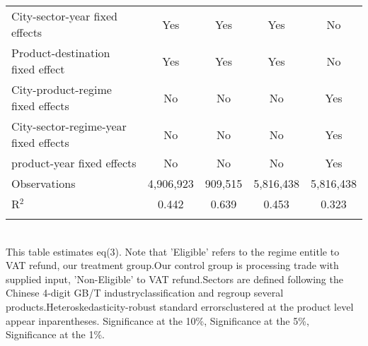 \documentclass[preview]{standalone}
\begin{document}
\begin{table}[!htbp]
\begin{adjustbox}{width=\textwidth, totalheight=\baselineskip,keepaspectratio}
\begin{tabular}{@{\extracolsep{5pt}}lcccc}
City-sector-year fixed effects & Yes & Yes & Yes & No \\ 
Product-destination fixed effect & Yes & Yes & Yes & No \\ 
City-product-regime fixed effects & No & No & No & Yes \\ 
City-sector-regime-year fixed effects & No & No & No & Yes \\ 
product-year fixed effects & No & No & No & Yes \\ 
Observations & 4,906,923 & 909,515 & 5,816,438 & 5,816,438 \\ 
R$^{2}$ & 0.442 & 0.639 & 0.453 & 0.323 \\ 
\hline 
\hline \\[-1.8ex] 
\end{tabular}
\end{adjustbox}
\begin{tablenotes} 
 \small 
 \item \\ 
This table estimates eq(3). Note that 'Eligible' refers to the regime entitle to VAT refund, our treatment group.Our control group is processing trade with supplied input, 'Non-Eligible' to VAT refund.Sectors are defined following the Chinese 4-digit GB/T industryclassification and regroup several products.Heteroskedasticity-robust standard errorsclustered at the product level appear inparentheses.\sym{*} Significance at the 10\%, \sym{**} Significance at the 5\%, \sym{***} Significance at the 1\%. 
\end{tablenotes}
\end{table}
\end{document}
